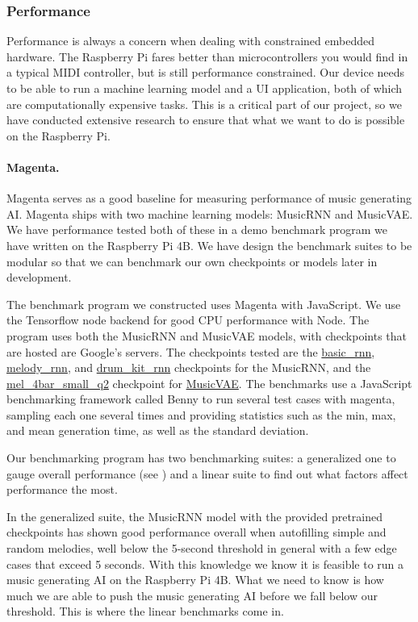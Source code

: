\subsubsection{Performance}

Performance is always a concern when dealing with constrained embedded hardware. The
Raspberry Pi fares better than microcontrollers you would find in a typical MIDI
controller, but is still performance constrained. Our device needs to be able to run a
machine learning model and a UI application, both of which are computationally expensive
tasks. This is a critical part of our project, so we have conducted extensive research to
ensure that what we want to do is possible on the Raspberry Pi.

\paragraph{Magenta.}

Magenta serves as a good baseline for measuring performance of music generating AI.
Magenta ships with two machine learning models: MusicRNN and MusicVAE. We have performance
tested both of these in a demo benchmark program we have written on the Raspberry Pi 4B.
We have design the benchmark suites to be modular so that we can benchmark our own
checkpoints or models later in development.

The benchmark program we constructed uses Magenta with JavaScript. We use the Tensorflow
node backend for good CPU performance with Node. The program uses both the MusicRNN and
MusicVAE models, with checkpoints that are hosted are Google's servers. The checkpoints
tested are the \url{basic_rnn}, \url{melody_rnn}, and \url{drum_kit_rnn} checkpoints for
the MusicRNN, and the \url{mel_4bar_small_q2} checkpoint for \url{MusicVAE}. The benchmarks
use a JavaScript benchmarking framework called Benny to run several test cases with
magenta, sampling each one several times and providing statistics such as the min, max,
and mean generation time, as well as the standard deviation.

Our benchmarking program has two benchmarking suites: a generalized one to gauge overall
performance (see ) and a linear suite to find out what
factors affect performance the most.

In the generalized suite, the MusicRNN model with the provided pretrained checkpoints has
shown good performance overall when autofilling simple and random melodies, well below the
5-second threshold in general with a few edge cases that exceed 5 seconds. With this
knowledge we know it is feasible to run a music generating AI on the Raspberry Pi 4B. What
we need to know is how much we are able to push the music generating AI before we fall
below our threshold. This is where the linear benchmarks come in.

